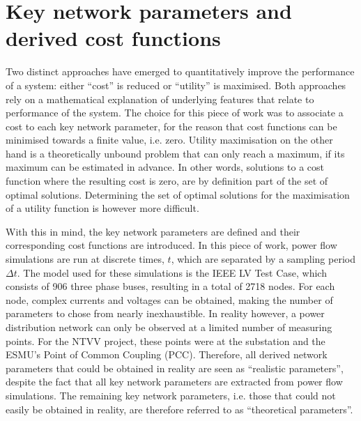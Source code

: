 \section{Key network parameters and derived cost functions}
\label{ch1:sec:key-network-parameters}

Two distinct approaches have emerged to quantitatively improve the performance of a system: either ``cost'' is reduced or ``utility'' is maximised.
Both approaches rely on a mathematical explanation of underlying features that relate to performance of the system.
The choice for this piece of work was to associate a cost to each key network parameter, for the reason that cost functions can be minimised towards a finite value, i.e. zero.
Utility maximisation on the other hand is a theoretically unbound problem that can only reach a maximum, if its maximum can be estimated in advance.
In other words, solutions to a cost function where the resulting cost is zero, are by definition part of the set of optimal solutions.
Determining the set of optimal solutions for the maximisation of a utility function is however more difficult.


With this in mind, the key network parameters are defined and their corresponding cost functions are introduced.
In this piece of work, power flow simulations are run at discrete times, $t$, which are separated by a sampling period $\Delta t$. 
The model used for these simulations is the IEEE LV Test Case, which consists of 906 three phase buses, resulting in a total of 2718 nodes.
For each node, complex currents and voltages can be obtained, making the number of parameters to chose from nearly inexhaustible.
In reality however, a power distribution network can only be observed at a limited number of measuring points.
For the NTVV project, these points were at the substation and the ESMU's Point of Common Coupling (PCC).
Therefore, all derived network parameters that could be obtained in reality are seen as ``realistic parameters'', despite the fact that all key network parameters are extracted from power flow simulations.
The remaining key network parameters, i.e. those that could not easily be obtained in reality, are therefore referred to as ``theoretical parameters''.

